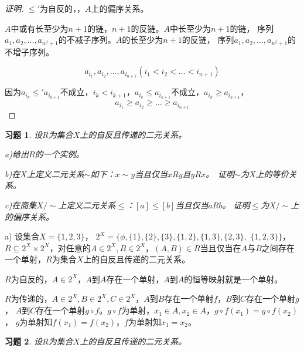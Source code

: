 \documentclass{beamer}
\newtheorem*{Exercise}{习题}
\begin{document}
\begin{CJK*}{UTF8}{gbsn}
\begin{frame}
\begin{proof}[证明]
    $\leq'$为自反的，，$A$上的偏序关系。
  
    \pause$A$中或有长至少为$n+1$的链，$n+1$的反链。\pause$A$中长至少为$n+1$的链，
    序列$a_1,a_2,\ldots,a_{n^2+1}$的不减子序列。$A$的长至少为$n+1$的反链，
    序列$a_1,a_2,\ldots,a_{n^2+1}$的不增子序列。
  
   \pause \[a_{i_1},a_{i_2},\ldots, a_{i_{n+1}}(i_1<i_2<\ldots<i_{n+1})\]
  
   \pause 因为$a_{i_k}\leq'a_{i_{k+1}}$不成立，$i_k<i_{k+1}$，$a_{i_k}\leq a_{i_{k+1}}$不成立，$a_{i_k}\geq a_{i_{k+1}}$，
    \pause
   \vspace{-0.5cm} \[a_{i_1}\geq a_{i_2}\geq \ldots\geq a_{i_{n+1}}\]
  
  \end{proof}
\end{frame}
\begin{frame}
  \begin{Exercise}
    设$R$为集合$X$上的自反且传递的二元关系。

  a)给出$R$的一个实例。

  b)在$X$上定义二元关系$\sim$如下：$x\sim y$当且仅当$x R y$且$y R x$。　证明$\sim$为$X$上的等价关系。

  c)在商集$X/\sim$上定义二元关系$\leq$：$[a]\leq [b]$当且仅当$aRb$。
  证明$\leq$为$X/\sim$上的偏序关系。  
\end{Exercise}

\justifying\let\raggedright\justifying
\pause a) 设集合$X=\{1,2,3\}$，
\pause$2^X=\{\phi,\{1\},\{2\},\{3\},\{1,2\},\{1,3\},\{2,3\},$ $\{1,2,3\}\}$，
 \pause$R\subseteq 2^X\times 2^X$，\pause 对任意的$A\in 2^X,B\in 2^X$，\pause$(A,B)\in R$当且仅当在$A$与$B$之间存在一个单射，$R$为集合$X$上的自反且传递的二元关系。

\pause $R$为自反的，$A\in 2^X$，$A$到$A$存在一个单射，$A$到$A$的恒等映射就是一个单射。

\pause $R$为传递的，$A\in 2^X, B\in 2^X, C\in 2^X$，$A$到$B$存在一个单射$f$，$B$到$C$存在一个单射$g$，
$A$到$C$存在一个单射$g\circ f$。\pause $g\circ f$为单射，$x_1\in A,x_2\in A$，$g\circ f(x_1)=g\circ f(x_2)$，
$g$为单射知$f(x_1)=f(x_2)$，$f$为单射知$x_1=x_2$。


\end{frame}
\begin{frame}
  \begin{Exercise}
    设$R$为集合$X$上的自反且传递的二元关系。


\end{Exercise}
\end{frame}
\end{CJK*}
\end{document}
